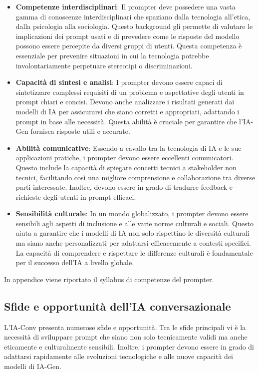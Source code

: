         \begin{itemize}
          \item \textbf{Competenze interdisciplinari}: Il prompter deve possedere una vasta gamma di conoscenze interdisciplinari che spaziano dalla tecnologia all'etica, dalla psicologia alla sociologia. Questo background gli permette di valutare le implicazioni dei prompt usati e di prevedere come le risposte del modello possono essere percepite da diversi gruppi di utenti. Questa competenza è essenziale per prevenire situazioni in cui la tecnologia potrebbe involontariamente perpetuare stereotipi o discriminazioni.
          \item \textbf{Capacità di sintesi e analisi}: I prompter devono essere capaci di sintetizzare complessi requisiti di un problema e aspettative degli utenti in prompt chiari e concisi. Devono anche analizzare i risultati generati dai modelli di IA per assicurarsi che siano corretti e appropriati, adattando i prompt in base alle necessità. Questa abilità è cruciale per garantire che l'IA-Gen fornisca risposte utili e accurate.
          \item \textbf{Abilità comunicative}: Essendo a cavallo tra la tecnologia di IA e le sue applicazioni pratiche, i prompter devono essere eccellenti comunicatori. Questo include la capacità di spiegare concetti tecnici a stakeholder non tecnici, facilitando così una migliore comprensione e collaborazione tra diverse parti interessate. Inoltre, devono essere in grado di tradurre feedback e richieste degli utenti in prompt efficaci.
          \item \textbf{Sensibilità culturale}: In un mondo globalizzato, i prompter devono essere sensibili agli aspetti di inclusione e alle varie norme culturali e sociali. Questo aiuta a garantire che i modelli di IA non solo rispettino le diversità culturali ma siano anche personalizzati per adattarsi efficacemente a contesti specifici. La capacità di comprendere e rispettare le differenze culturali è fondamentale per il successo dell'IA a livello globale.
        \end{itemize}
        In appendice viene riportato il syllabus di competenze del prompter.
 
    \subsection{Sfide e opportunità dell'IA conversazionale}
        L'IA-Conv presenta numerose sfide e opportunità. Tra le sfide principali vi è la necessità di sviluppare prompt che siano non solo tecnicamente validi ma anche eticamente e culturalmente sensibili. Inoltre, i prompter devono essere in grado di adattarsi rapidamente alle evoluzioni tecnologiche e alle nuove capacità dei modelli di IA-Gen.
    
